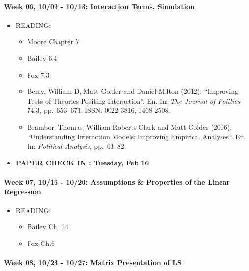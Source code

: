 \documentclass[11pt,]{article}
\providecommand{\tightlist}{%
  \setlength{\itemsep}{0pt}\setlength{\parskip}{0pt}}
\begin{document}
\paragraph{Week 06, 10/09 - 10/13: Interaction Terms,
Simulation}\label{week-06-1009---1013-interaction-terms-simulation}

\begin{itemize}
\tightlist
\item
  READING:

  \begin{itemize}
  \item
    Moore Chapter 7
  \item
    Bailey 6.4
  \item
    Fox 7.3
  \item
     Berry, William D, Matt Golder and Daniel Milton
    (2012). ``Improving Tests of Theories Positing Interaction''. En.
    In: \emph{The Journal of Politics} 74.3, pp.~653--671. ISSN:
    0022-3816, 1468-2508.
  \item
     Brambor, Thomas, William Roberts Clark and Matt
    Golder (2006). ``Understanding Interaction Models: Improving
    Empirical Analyses''. En. In: \emph{Political Analysis}, pp.~63--82.
  \end{itemize}
\item
  \textbf{PAPER CHECK IN : Tuesday, Feb 16 }
\end{itemize}

\paragraph{Week 07, 10/16 - 10/20: Assumptions \& Properties of the
Linear
Regression}\label{week-07-1016---1020-assumptions-properties-of-the-linear-regression}

\begin{itemize}
\tightlist
\item
  READING:

  \begin{itemize}
  \tightlist
  \item
    Bailey Ch. 14
  \item
    Fox Ch.6
  \end{itemize}
\end{itemize}

\paragraph{Week 08, 10/23 - 10/27: Matrix Presentation of
LS}\label{week-08-1023---1027-matrix-presentation-of-ls}
\end{document}

